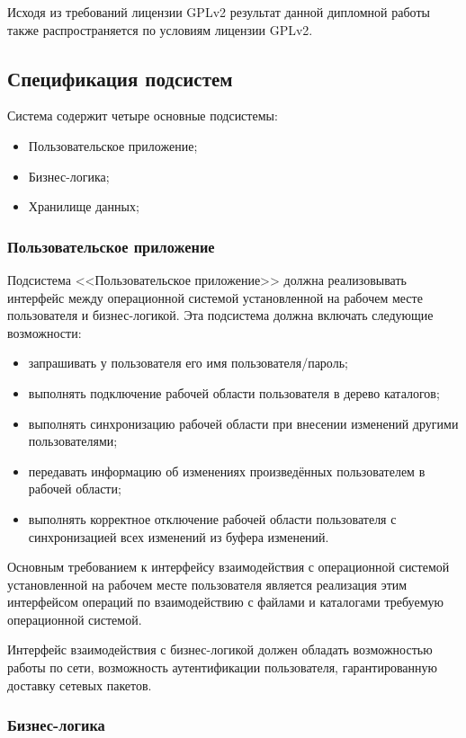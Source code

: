 \documentclass[utf8,usehyperref,12pt]{G7-32}
\begin{document}
Исходя из требований лицензии GPLv2 результат данной дипломной работы также распространяется по условиям лицензии GPLv2.

\subsection{Спецификация подсистем}\label{ssect_subsys}

Система содержит четыре основные подсистемы:
\begin{itemize}
 \item Пользовательское приложение;
 \item Бизнес-логика;
 \item Хранилище данных;
\end{itemize}

\subsubsection{Пользовательское приложение}

Подсистема <<Пользовательское приложение>> должна реализовывать интерфейс между операционной системой установленной на рабочем месте пользователя и бизнес-логикой. Эта подсистема должна включать следующие возможности:
\begin{itemize}
 \item запрашивать у пользователя его имя пользователя/пароль;
 \item выполнять подключение рабочей области пользователя в дерево каталогов;
 \item выполнять синхронизацию рабочей области при внесении изменений другими пользователями;
 \item передавать информацию об изменениях произведённых пользователем в рабочей области;
 \item выполнять корректное отключение рабочей области пользователя с синхронизацией всех изменений из буфера изменений.
\end{itemize}

Основным требованием к интерфейсу взаимодействия с операционной системой установленной на рабочем месте пользователя является реализация этим интерфейсом операций по взаимодействию с файлами и каталогами требуемую операционной системой.

Интерфейс взаимодействия с бизнес-логикой должен обладать возможностью работы по сети, возможность аутентификации пользователя, гарантированную доставку сетевых пакетов.

\subsubsection{Бизнес-логика}
\end{document}
